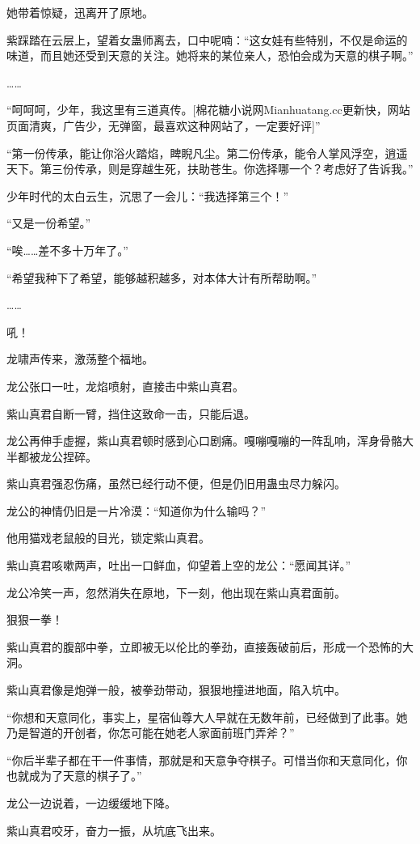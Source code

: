 \begin{this_body}
她带着惊疑，迅离开了原地。

紫踩踏在云层上，望着女蛊师离去，口中呢喃：“这女娃有些特别，不仅是命运的味道，而且她还受到天意的关注。她将来的某位亲人，恐怕会成为天意的棋子啊。”

……

“呵呵呵，少年，我这里有三道真传。[棉花糖小说网Mianhuatang.cc更新快，网站页面清爽，广告少，无弹窗，最喜欢这种网站了，一定要好评]”

“第一份传承，能让你浴火踏焰，睥睨凡尘。第二份传承，能令人掌风浮空，逍遥天下。第三份传承，则是穿越生死，扶助苍生。你选择哪一个？考虑好了告诉我。”

少年时代的太白云生，沉思了一会儿：“我选择第三个！”

“又是一份希望。”

“唉……差不多十万年了。”

“希望我种下了希望，能够越积越多，对本体大计有所帮助啊。”

……

吼！

龙啸声传来，激荡整个福地。

龙公张口一吐，龙焰喷射，直接击中紫山真君。

紫山真君自断一臂，挡住这致命一击，只能后退。

龙公再伸手虚握，紫山真君顿时感到心口剧痛。嘎嘣嘎嘣的一阵乱响，浑身骨骼大半都被龙公捏碎。

紫山真君强忍伤痛，虽然已经行动不便，但是仍旧用蛊虫尽力躲闪。

龙公的神情仍旧是一片冷漠：“知道你为什么输吗？”

他用猫戏老鼠般的目光，锁定紫山真君。

紫山真君咳嗽两声，吐出一口鲜血，仰望着上空的龙公：“愿闻其详。”

龙公冷笑一声，忽然消失在原地，下一刻，他出现在紫山真君面前。

狠狠一拳！

紫山真君的腹部中拳，立即被无以伦比的拳劲，直接轰破前后，形成一个恐怖的大洞。

紫山真君像是炮弹一般，被拳劲带动，狠狠地撞进地面，陷入坑中。

“你想和天意同化，事实上，星宿仙尊大人早就在无数年前，已经做到了此事。她乃是智道的开创者，你怎可能在她老人家面前班门弄斧？”

“你后半辈子都在干一件事情，那就是和天意争夺棋子。可惜当你和天意同化，你也就成为了天意的棋子了。”

龙公一边说着，一边缓缓地下降。

紫山真君咬牙，奋力一振，从坑底飞出来。


\end{this_body}
